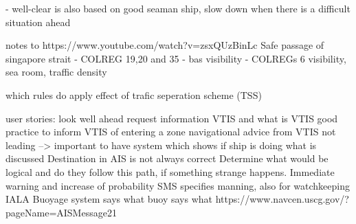 - well-clear is also based on good seaman ship, slow down when there is a difficult situation ahead


notes to https://www.youtube.com/watch?v=zsxQUzBinLc
Safe passage of singapore strait
- COLREG 19,20 and 35 - bas visibility
- COLREGs 6 visibility, sea room, traffic density

which rules do apply
effect of trafic seperation scheme (TSS)


user stories:
look well ahead
request information VTIS and what is VTIS
good practice to inform VTIS of entering a zone
navigational advice from VTIS not leading --> important to have system which shows if ship is doing what is discussed
Destination in AIS is not always correct
Determine what would be logical and do they follow this path, if something strange happens. Immediate warning and increase of probability
SMS specifies manning, also for watchkeeping
IALA Buoyage system says what buoy says what
https://www.navcen.uscg.gov/?pageName=AISMessage21